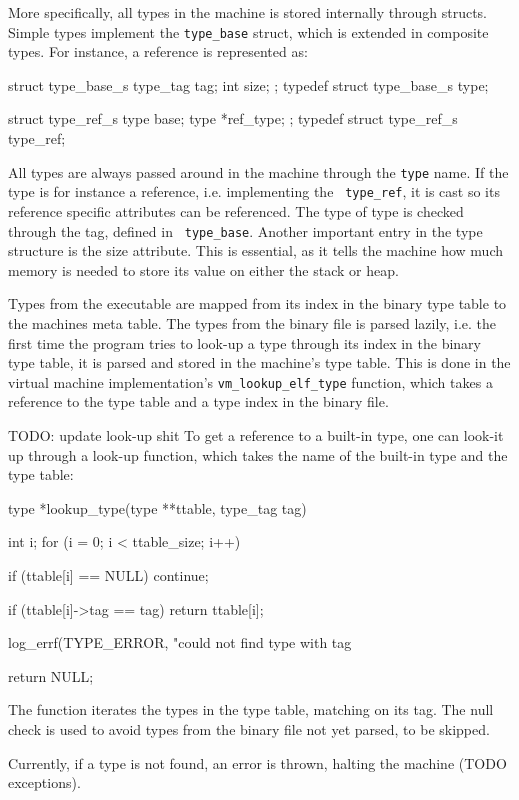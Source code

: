 More specifically, all types in the machine is stored internally through
structs. Simple types implement the {\tt type\_base} struct, which is extended
in composite types. For instance, a reference is represented as:
\begin{ccode}
struct type_base_s {
    type_tag tag;
    int size;
};
typedef struct type_base_s type;

struct type_ref_s {
    type base;
    type *ref_type;
};
typedef struct type_ref_s type_ref;
\end{ccode}

All types are always passed around in the machine through the {\tt type}
name. If the type is for instance a reference, i.e. implementing the {\tt
  type\_ref}, it is cast so its reference specific attributes can be
referenced. The type of type is checked through the tag, defined in {\tt
  type\_base}. Another important entry in the type structure is the size
attribute. This is essential, as it tells the machine how much memory is needed
to store its value on either the stack or heap.

Types from the executable are mapped from its index in the binary type table to
the machines meta table. The types from the binary file is parsed lazily,
i.e. the first time the program tries to look-up a type through its index in the
binary type table, it is parsed and stored in the machine's type table. This is
done in the virtual machine implementation's {\tt vm\_lookup\_elf\_type}
function, which takes a reference to the type table and a type index in the
binary file.

TODO: update look-up shit
To get a reference to a built-in type, one can look-it up through a look-up
function, which takes the name of the built-in type and the type table:
\begin{ccode} %
type *lookup_type(type **ttable, type_tag tag)
{
    int i;
    for (i = 0; i < ttable_size; i++) {
        if (ttable[i] == NULL)
            continue;

        if (ttable[i]->tag == tag)
            return ttable[i];
    }

    log_errf(TYPE_ERROR, "could not find type with tag %

    return NULL;
}
\end{ccode}
The function iterates the types in the type table, matching on its tag. The null
check is used to avoid types from the binary file not yet parsed, to be skipped.

Currently, if a type is not found, an error is thrown, halting the machine (TODO
exceptions).

